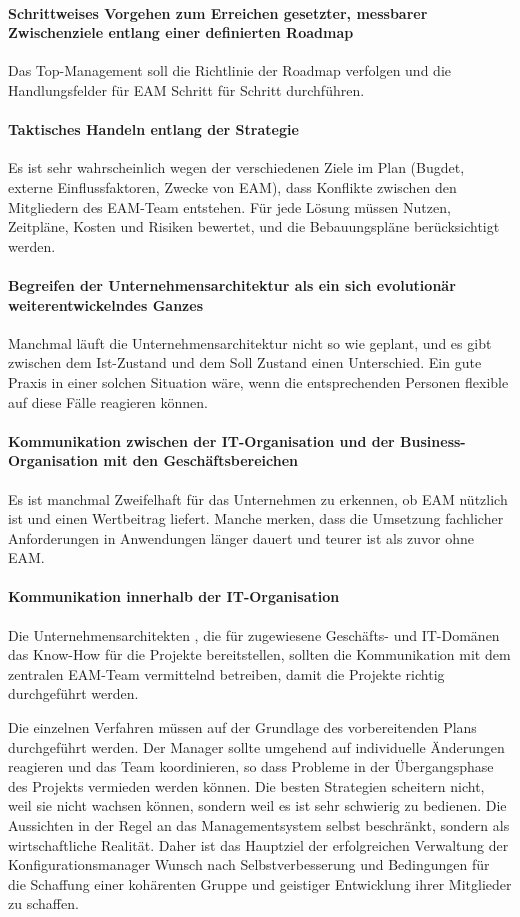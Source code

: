 \documentclass[doc]{apa6}
\begin{document}
\paragraph{Schrittweises Vorgehen zum Erreichen gesetzter, messbarer Zwischenziele entlang einer definierten Roadmap} Das Top-Management soll die Richtlinie der Roadmap verfolgen und die Handlungsfelder für EAM Schritt für Schritt durchführen.
\paragraph{Taktisches Handeln entlang der Strategie} Es ist sehr wahrscheinlich wegen der verschiedenen Ziele im Plan (Bugdet, externe Einflussfaktoren, Zwecke von EAM), dass Konflikte zwischen den Mitgliedern des EAM-Team entstehen. Für jede Lösung müssen Nutzen, Zeitpläne, Kosten und Risiken bewertet, und die Bebauungspläne berücksichtigt werden.
\paragraph{Begreifen der Unternehmensarchitektur als ein sich evolutionär weiterentwickelndes  Ganzes} Manchmal läuft die Unternehmensarchitektur nicht so wie geplant, und es gibt zwischen dem Ist-Zustand und dem Soll Zustand einen Unterschied. Ein gute Praxis in einer solchen Situation wäre, wenn die entsprechenden Personen flexible auf diese Fälle reagieren können.
\paragraph{Kommunikation zwischen der IT-Organisation und der Business-Organisation mit den Geschäftsbereichen} Es ist manchmal Zweifelhaft für das Unternehmen zu erkennen, ob EAM nützlich ist und einen Wertbeitrag liefert. Manche merken, dass die Umsetzung fachlicher Anforderungen in Anwendungen länger dauert und teurer ist als zuvor ohne EAM.
\paragraph{Kommunikation innerhalb der IT-Organisation} Die Unternehmensarchitekten , die für zugewiesene Geschäfts- und IT-Domänen das Know-How für die Projekte bereitstellen, sollten die Kommunikation mit dem zentralen EAM-Team vermittelnd betreiben, damit die Projekte richtig durchgeführt werden.\autocite{Korotkov2013}

Die einzelnen Verfahren müssen auf der Grundlage des vorbereitenden Plans durchgeführt werden. Der Manager sollte umgehend auf individuelle Änderungen reagieren und das Team koordinieren, so dass Probleme in der Übergangsphase des Projekts vermieden werden können. Die besten Strategien scheitern nicht, weil sie nicht wachsen können, sondern weil es ist sehr schwierig zu bedienen. Die Aussichten in der Regel an das Managementsystem selbst beschränkt, sondern als wirtschaftliche Realität. Daher ist das Hauptziel der erfolgreichen Verwaltung der Konfigurationsmanager Wunsch nach Selbstverbesserung und Bedingungen für die Schaffung einer kohärenten Gruppe und geistiger Entwicklung ihrer Mitglieder zu schaffen.
\end{document}
